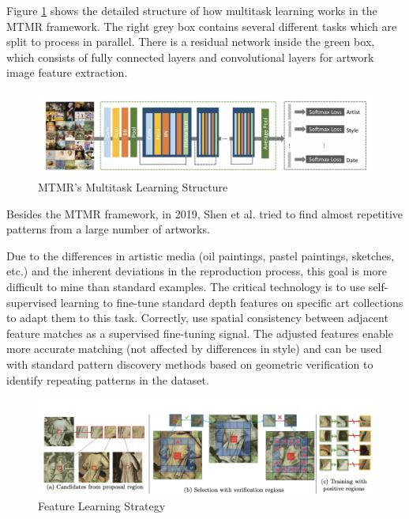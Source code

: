 Figure \ref{fig:mtmrmulti} shows the detailed structure of how multitask learning works in the MTMR framework. The right grey box contains several different tasks which are split to process in parallel. There is a residual network inside the green box, which consists of fully connected layers and convolutional layers for artwork image feature extraction.


\begin{figure}[h!]
\centering
\includegraphics[width=.95\textwidth]{MTMRmultitask.pdf}
\caption{MTMR's Multitask Learning Structure \cite{parttowhole}}
\label{fig:mtmrmulti}
\end{figure}

Besides the MTMR framework, in 2019, Shen et al. \cite{shen2019discovering} tried to find almost repetitive patterns from a large number of artworks. 

Due to the differences in artistic media (oil paintings, pastel paintings, sketches, etc.) and the inherent deviations in the reproduction process, this goal is more difficult to mine than standard examples. The critical technology is to use self-supervised learning to fine-tune standard depth features on specific art collections to adapt them to this task. Correctly, use spatial consistency between adjacent feature matches as a supervised fine-tuning signal. The adjusted features enable more accurate matching (not affected by differences in style) and can be used with standard pattern discovery methods based on geometric verification to identify repeating patterns in the dataset.

\begin{figure}[h!]
\centering
\includegraphics[width=\textwidth]{featurelearningartwork.pdf}
\caption{Feature Learning Strategy \cite{shen2019discovering}}
\label{fig:featurelearning}
\end{figure}

